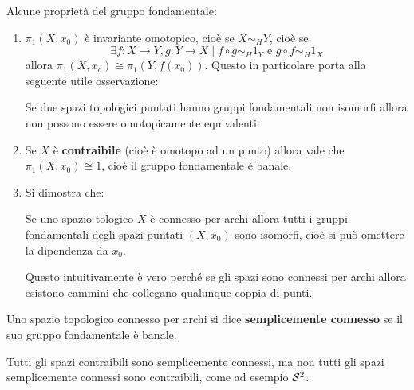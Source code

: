 Alcune proprietà del gruppo fondamentale:
\begin{enumerate}
\item $ \pi_1(X,x_0) $ è invariante omotopico, cioè se $ X \sim_H Y $, cioè se
  \[
    \exists f: X \to Y, g: Y \to X \; | \; f \circ g \sim_H 1_Y \text{ e }  g \circ f \sim_H 1_X
  \]
  allora $ \pi_1(X,x_o) \cong \pi_1(Y,f(x_0)) $. Questo in particolare porta alla seguente
  utile osservazione:
  \begin{osservation}
    Se due spazi topologici puntati hanno gruppi fondamentali non isomorfi allora
    non possono essere omotopicamente equivalenti.
  \end{osservation}
\item Se $ X $ è \textbf{contraibile} (cioè è
  omotopo ad un punto) allora vale che $ \pi_1(X,x_0) \cong 1 $, cioè il gruppo
  fondamentale è banale.
\item Si dimostra che:
  \begin{proposition}
    Se uno spazio tologico $ X $ è connesso per archi allora tutti i gruppi fondamentali
    degli spazi puntati $ (X,x_0) $ sono isomorfi, cioè si può omettere la dipendenza da $ x_0 $.
  \end{proposition}
  Questo intuitivamente è vero perché se gli spazi sono connessi per archi allora esistono cammini
  che collegano qualunque coppia di punti.
\end{enumerate}

\begin{definition}
  Uno spazio topologico connesso per archi si dice \textbf{semplicemente connesso}
  se il suo gruppo fondamentale è banale.
\end{definition}

\begin{osservation}
  Tutti gli spazi contraibili sono semplicemente connessi, ma
  non tutti gli spazi semplicemente connessi sono contraibili, come ad esempio $ \mathcal{S}^{2} $.
\end{osservation}

